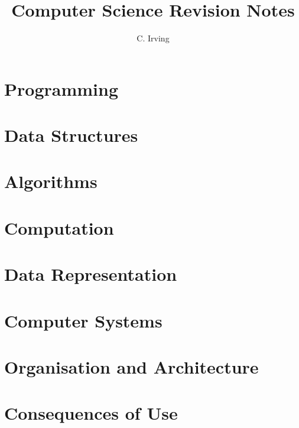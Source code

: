 \documentclass{book}
\title{\Huge Computer Science Revision Notes}
\author{C. Irving}
\date{}
\begin{document}
\maketitle

\tableofcontents

\mainmatter

\chapter{Programming} \label{ch:programming}
    

\chapter{Data Structures} \label{ch:data_structures}
    

\chapter{Algorithms} \label{ch:algorithms}
    

\chapter{Computation} \label{ch:computation}
    

\chapter{Data Representation} \label{ch:data_representation}
    

\chapter{Computer Systems} \label{ch:computer_systems}
    

\chapter{Organisation and Architecture} \label{ch:organisation_and_architecture}
    

\chapter{Consequences of Use} \label{ch:consequences_of_use}
    
\end{document}

